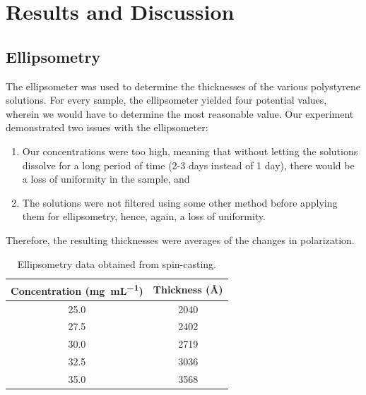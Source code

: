 \documentclass[twocolumn]{article}
\begin{document}
        \section{Results and Discussion}
            \subsection{Ellipsometry}
                The ellipsometer was used to determine the thicknesses of the various polystyrene solutions. For every sample, the ellipsometer yielded four potential values, wherein we would have to determine the most reasonable value. Our experiment demonstrated two issues with the ellipsometer:
                \begin{enumerate}
                    \item Our concentrations were too high, meaning that without letting the solutions dissolve for a long period of time (2-3 days instead of 1 day), there would be a loss of uniformity in the sample, and
                    \item The solutions were not filtered using some other method before applying them for ellipsometry, hence, again, a loss of uniformity.
                \end{enumerate}
                
                Therefore, the resulting thicknesses were averages of the changes in polarization.

                \begin{table}
                    \centering
                        \begin{tabular}{@{}cc@{}}
                            \toprule
                            Concentration (\unit{\milli\gram\per\milli\liter}) & Thickness (\unit{\angstrom}) \\ \midrule
                            25.0                  & 2040          \\
                            27.5                  & 2402          \\
                            30.0                  & 2719          \\
                            32.5                  & 3036          \\
                            35.0                  & 3568          \\ \bottomrule
                        \end{tabular}
                        \caption{Ellipsometry data obtained from spin-casting.}\label{tab:ellips}
                \end{table}
\end{document}
